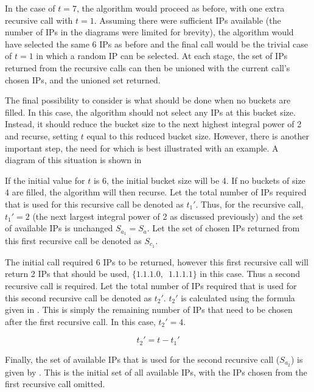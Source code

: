 In the case of $t = 7$, the algorithm would proceed as before, with one extra recursive call with $t = 1$. Assuming there were sufficient IPs available (the number of IPs in the diagrams were limited for brevity), the algorithm would have selected the same 6 IPs as before and the final call would be the trivial case of $t = 1$ in which a random IP can be selected. At each stage, the set of IPs returned from the recursive calls can then be unioned with the current call's chosen IPs, and the unioned set returned. 

The final possibility to consider is what should be done when no buckets are filled. In this case, the algorithm should not select any IPs at this bucket size. Instead, it should reduce the bucket size to the next highest integral power of 2 and recurse, setting $t$ equal to this reduced bucket size. However, there is another important step, the need for which is best illustrated with an example. A diagram of this situation is shown in 

If the initial value for $t$ is 6, the initial bucket size will be 4. If no buckets of size 4 are filled, the algorithm will then recurse. Let the total number of IPs required that is used for this recursive call be denoted as $t_1'$. Thus, for the recursive call, $t_1' = 2$ (the next largest integral power of 2 as discussed previously) and the set of available IPs is unchanged $S_{a_1} = S_a$. Let the set of chosen IPs returned from this first recursive call be denoted as $S_{c_1}$.

The initial call required 6 IPs to be returned, however this first recursive call will return 2 IPs that should be used, $\{1.1.1.0,\enspace1.1.1.1\}$ in this case. Thus a second recursive call is required. Let the total number of IPs required that is used for this second recursive call be denoted as $t_2'$. $t_2'$ is calculated using the formula given in . This is simply the remaining number of IPs that need to be chosen after the first recursive call. In this case, $t_2' = 4$. 

\begin{equation}\label{eq:secondRecurseT2}
t_2' = t - t_1'
\end{equation}

Finally, the set of available IPs that is used for the second recursive call ($S_{a_2}$) is given by . This is the initial set of all available IPs, with the IPs chosen from the first recursive call omitted.

